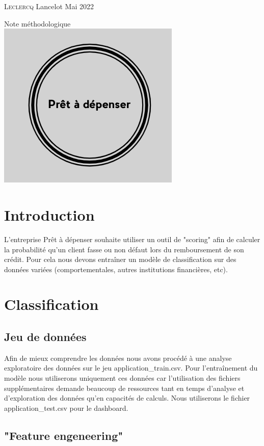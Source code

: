 \documentclass[12pt, a4paper]{article}
\begin{document}
\date{mai 2022}
\begin{titlepage}
    \large{\textsc{Leclercq} Lancelot} \hfill \normalsize{Mai 2022}
    \vfill
    \begin{center}
        \huge{Note méthodologique}\\
        \vfill
        \includegraphics[width=.3\textwidth]{logoPAD.png}\\
    \end{center}
    \vfill
    \renewcommand{\contentsname}{Sommaire}
    \pdfbookmark{\contentsname}{toc}
    \tableofcontents
\end{titlepage}

\section{Introduction}

L'entreprise Prêt à dépenser souhaite utiliser un outil de "scoring" afin de calculer la probabilité qu'un client fasse ou non défaut lors du remboursement de son crédit.
Pour cela nous devons entraîner un modèle de classification sur des données variées (comportementales, autres institutions financières, etc).

\section{Classification}
\subsection{Jeu de données}

Afin de mieux comprendre les données nous avons procédé à une analyse exploratoire des données sur le jeu application\_train.csv.
Pour l'entraînement du modèle nous utiliserons uniquement ces données car l'utilisation des fichiers supplémentaires demande beaucoup de ressources tant en temps d'analyse et d'exploration des données qu'en capacités de calculs.
Nous utiliserons le fichier application\_test.csv pour le dashboard.

\subsection{"Feature engeneering"}
\end{document}
